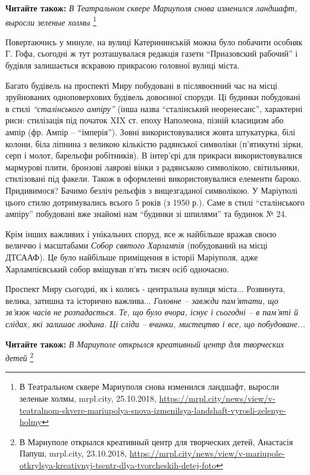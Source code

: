 \textbf{Читайте також:} \emph{В Театральном сквере Мариуполя снова изменился ландшафт, выросли зеленые холмы}%
\footnote{В Театральном сквере Мариуполя снова изменился ландшафт, выросли зеленые холмы, mrpl.city, 25.10.2018, \url{https://mrpl.city/news/view/v-teatralnom-skvere-mariupolya-snova-izmenilsya-landshaft-vyrosli-zelenye-holmy}}

Повертаючись у минуле, на вулиці Катерининській можна було побачити особняк Г.
Гофа, сьогодні ж тут розташувалася редакція газети \enquote{Приазовский рабочий} і
будівля залишається яскравою прикрасою головної вулиці міста.


Багато будівель на проспекті Миру побудовані в післявоєнний час на місці
зруйнованих одноповерхових будівель довоєнної споруди. Ці будинки побудовані в
стилі \emph{\enquote{сталінського ампіру}} (інша назва \enquote{сталінський неоренесанс}, характерні
риси: стилізація під початок XIX ст. епоху Наполеона, пізній класицизм або
ампір (фр. Ампір – \enquote{імперія}). Зовні використовувалися жовта штукатурка, білі
колони, біла ліпнина з великою кількістю радянської символіки (п'ятикутні
зірки, серп і молот, барельєфи робітників). В інтер'єрі для прикраси
використовувалися мармурові плити, бронзові лаврові вінки з радянською
символікою, світильники, стилізовані під факели. Також в оформленні
використовувалися елементи бароко. Придивимося? Бачимо безліч рельєфів з
вищезгаданої символікою. У Маріуполі цього стилю дотримувались всього 5 років
(з 1950 р.). Саме в стилі \enquote{сталінського ампіру} побудовані вже знайомі нам
\enquote{будинки зі шпилями} та будинок № 24.


Крім інших важливих і унікальних споруд, все ж найбільше вражав своєю величчю і
масштабами \emph{Собор святого Харлампія} (побудований на місці ДТСААФ). Це було
найбільше приміщення в історії Маріуполя, адже Харлампієвський собор вміщував
п'ять тисяч осіб одночасно.

Проспект Миру сьогодні, як і колись - центральна вулиця міста...  Розвинута,
велика, затишна та історично важлива... \emph{Головне – завжди пам'ятати, що зв'язок
часів не розпадається. Те, що було вчора, існує і сьогодні – в пам'яті й
слідах, які залишає людина. Ці сліди – вчинки, мистецтво і все, що побудоване...}

\textbf{Читайте також:} \emph{В Мариуполе открылся креативный центр для творческих детей}%
\footnote{В Мариуполе открылся креативный центр для творческих детей, Анастасія Папуш, mrpl.city, 23.10.2018, \url{https://mrpl.city/news/view/v-mariupole-otkrylsya-kreativnyj-tsentr-dlya-tvorcheskih-detej-foto}}

\clearpage
